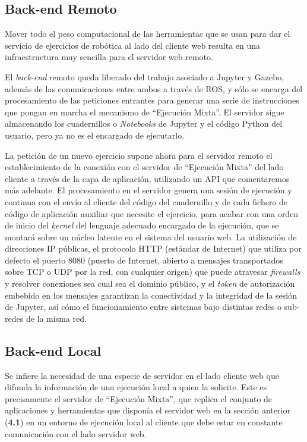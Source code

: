 \subsection{Back-end Remoto}

Mover todo el peso computacional de las herramientas que se usan para dar el servicio de ejercicios de robótica al lado del cliente web resulta en una infraestructura muy sencilla para el servidor web remoto.

El \textit{back-end} remoto queda liberado del trabajo asociado a Jupyter y Gazebo, además de las comunicaciones entre ambos a través de ROS, y sólo se encarga del procesamiento de las peticiones entrantes para generar una serie de instrucciones que pongan en marcha el mecanismo de ``Ejecución Mixta''. El servidor sigue almacenando los cuadernillos o \textit{Notebooks} de Jupyter y el código Python del usuario, pero ya no es el encargado de ejecutarlo.

La petición de un nuevo ejercicio supone ahora para el servidor remoto el establecimiento de la conexión con el servidor de ``Ejecución Mixta'' del lado cliente a través de la capa de aplicación, utilizando un API que comentaremos más adelante. El procesamiento en el servidor genera una sesión de ejecución y continua con el envío al cliente del código del cuadernillo y de cada fichero de código de aplicación auxiliar que necesite el ejercicio, para acabar con una orden de inicio del \textit{kernel} del lenguaje adecuado encargado de la ejecución, que se montará sobre un núcleo latente en el sistema del usuario web. La utilización de direcciones IP públicas, el protocolo HTTP (estándar de Internet) que utiliza por defecto el puerto 8080 (puerto de Internet, abierto a mensajes transportados sobre TCP o UDP por la red, con cualquier origen) que puede atravesar \textit{firewalls} y resolver conexiones sea cual sea el dominio público, y el \textit{token} de autorización embebido en los mensajes garantizan la conectividad y la integridad de la sesión de Jupyter, así cómo el funcionamiento entre sistemas bajo distintas redes o sub-redes de la misma red.

\subsection{Back-end Local}

Se infiere la necesidad de una especie de servidor en el lado cliente web que difunda la información de una ejecución local a quien la solicite. Este es precisamente el servidor de ``Ejecución Mixta'', que replica el conjunto de aplicaciones y herramientas que disponía el servidor web en la sección anterior (\textbf{4.1}) en un entorno de ejecución local al cliente que debe estar en constante comunicación con el lado servidor web.

